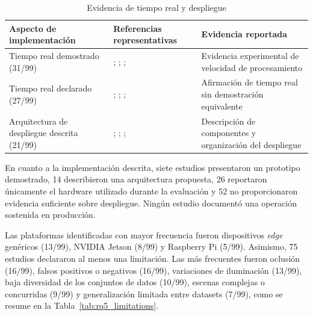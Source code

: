 \documentclass[pdflatex,sn-mathphys-num]{sn-jnl}%
\theoremstyle{thmstyleone}%
\theoremstyle{thmstyletwo}%
\theoremstyle{thmstylethree}%
\begin{document}
\begingroup
\small
\setlength{\tabcolsep}{4pt}
\renewcommand{\arraystretch}{1.15}
\begin{table}[!htbp]
\centering
\caption{Evidencia de tiempo real y despliegue}
\label{tab:rq5_results}
\begin{tabular}{@{}L{3.2cm}L{5.0cm}L{4.1cm}@{}}
\toprule
\textbf{Aspecto de implementación} & \textbf{Referencias representativas} & \textbf{Evidencia reportada} \\
\midrule
Tiempo real demostrado (31/99) & \citet{fierrosilva2026}; \citet{fathy2022}; \citet{ingle2022}; \citet{saleem2022} & Evidencia experimental de velocidad de procesamiento \\
Tiempo real declarado (27/99) & \citet{munoz2025}; \citet{shah2023}; \citet{g2025}; \citet{shah2025} & Afirmación de tiempo real sin demostración equivalente \\
Arquitectura de despliegue descrita (21/99) & \citet{munoz2025}; \citet{fierrosilva2026}; \citet{fathy2022}; \citet{ingle2022} & Descripción de componentes y organización del despliegue \\
\bottomrule
\end{tabular}
\end{table}
\FloatBarrier
\endgroup

En cuanto a la implementación descrita, siete estudios
presentaron un prototipo demostrado, 14 describieron una arquitectura propuesta,
26 reportaron únicamente el hardware utilizado durante la evaluación y 52 no
proporcionaron evidencia suficiente sobre despliegue. Ningún estudio documentó
una operación sostenida en producción.

Las plataformas identificadas con mayor frecuencia fueron dispositivos
\textit{edge} genéricos (13/99), NVIDIA Jetson (8/99) y Raspberry Pi (5/99).
Asimismo, 75 estudios declararon al menos una limitación. Las más frecuentes fueron
oclusión (16/99), falsos positivos o negativos (16/99), variaciones de iluminación
(13/99), baja diversidad de los conjuntos de datos (10/99), escenas complejas o
concurridas (9/99) y generalización limitada entre datasets (7/99), como se resume
en la Tabla~\ref{tab:rq5_limitations}.
\end{document}
